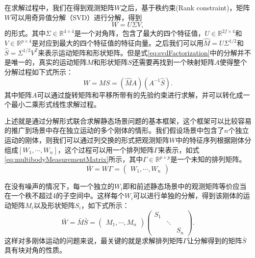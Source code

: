 在求解过程中，我们在得到观测矩阵$W$之后，基于秩约束(Rank constraint)\cite{Costeira1998A}，矩阵$W$可以用奇异值分解（SVD）进行分解，得到
\begin{equation}\label{eq:svdFactorization}
W=U\Sigma V,
\end{equation}
的形式。其中$\Sigma\in \mathbb{R}^{4\times4}$是一个对角阵，包含了最大的四个特征值，$U\in \mathbb{R}^{2f\times4}$和$V\in \mathbb{R}^{p\times4}$是对应到最大的四个特征值的特征向量。之后我们可以用$\hat{M}=U\Sigma^{1/2}$和$\hat{S}=\Sigma^{1/2}V^T$来表示运动矩阵和形状矩阵。但是式\eqref{eq:svdFactorization}中的分解并不是唯一的，真实的运动矩阵$M$和形状矩阵$S$还需要再找到一个映射矩阵$A$使得整个分解过程如下式所示：
\begin{equation}
W=M S=(\hat{M}A)(A^{-1}\hat{S}).
\end{equation}
其中矩阵$A$可以通过旋转矩阵和平移所带有的先验约束进行求解，并可以转化成一个最小二乘形式线性求解过程\cite{Costeira1998A,Tomasi1992Shape}。

上述就是通过分解形式联合求解静态场景问题的基本框架，这个框架可以比较容易的推广到场景中存在独立运动的多个刚体的情形\cite{Costeira1998A}。我们假设场景中包含了$n$个独立运动的刚体，则我们可以通过列交换的形式把观测矩阵$W$中的特征序列根据刚体分组成$[W_1,\cdots,W_n]$，这个过程可以用一个排列矩阵$\Gamma$来表示，如式\eqref{eq:multibodyMeasurementMatrix}所示，其中$\Gamma\in \mathbb{R}^{p\times p}$是一个未知的排列矩阵。
\begin{equation}\label{eq:multibodyMeasurementMatrix}
\bar{W}=W \Gamma=\begin{pmatrix}
W_1,\cdots,W_n
\end{pmatrix}
\end{equation}

在没有噪声的情况下，每一个独立的$W_i$即和前述静态场景中的观测矩阵等价应当在一个秩不超过4的子空间中。这样每个$W_i$可以进行单独的分解，得到该刚体的运动矩阵$M_i$以及形状矩阵$S_i$，如下式所示：
\begin{equation}\label{eq:multibodyFactorization}
\bar{W}=\bar{M} \bar{S} = 
\begin{pmatrix}
M_1,\cdots,M_n
\end{pmatrix}
\begin{pmatrix}
	S_1 & &\\
	&\ddots&\\
	&      &S_n
\end{pmatrix}
.\end{equation}
这样对多刚体运动的问题来说，最关键的就是求解排列矩阵$\Gamma$让分解得到的矩阵$\bar{S}$具有块对角的性质。

